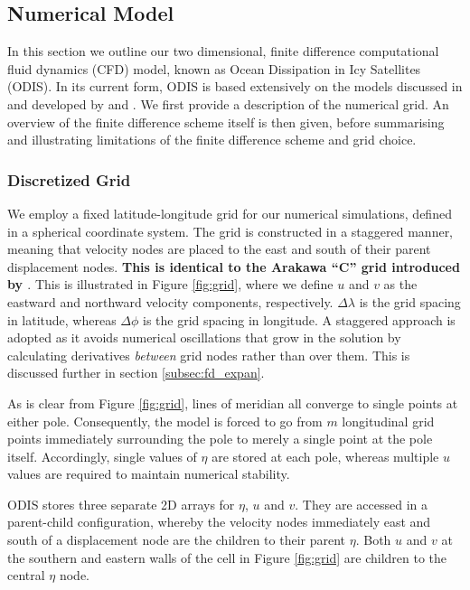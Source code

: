 \subsection{Numerical Model \label{subsec:model}}

In this section we outline our two dimensional, finite difference computational fluid dynamics (CFD) model, known as Ocean Dissipation in Icy Satellites (ODIS). In its current form, ODIS is based extensively on the models discussed in and developed by \citet{zahel1973diurnalk,zahel1978influence} and \citet{sears1994tidal,sears1995tidal}. We first provide a description of the numerical grid. An overview of the finite difference scheme itself is then given, before summarising and illustrating limitations of the finite difference scheme and grid choice.

\subsubsection{Discretized Grid \label{subsec:grid}}

We employ a fixed latitude-longitude grid for our numerical simulations, defined in a spherical coordinate system. The grid is constructed in a staggered manner, meaning that velocity nodes are placed to the east and south of their parent displacement nodes. \textbf{This is identical to the Arakawa ``C'' grid introduced by \citet{arakawa1977computational}}. This is illustrated in Figure \ref{fig:grid}, where we define $u$ and $v$ as the eastward and northward velocity components, respectively. $\Delta \lambda$ is the grid spacing in latitude, whereas $\Delta \phi$ is the grid spacing in longitude. A staggered approach is adopted as it avoids numerical oscillations that grow in the solution by calculating derivatives \textit{between} grid nodes rather than over them. This is discussed further in section \ref{subsec:fd_expan}.

As is clear from Figure \ref{fig:grid}, lines of meridian all converge to single points at either pole. Consequently, the model is forced to go from $m$ longitudinal grid points immediately surrounding the pole to merely a single point at the pole itself. Accordingly, single values of $\eta$ are stored at each pole, whereas multiple $u$ values are required to maintain numerical stability. 

ODIS stores three separate 2D arrays for $\eta$, $u$ and $v$. They are accessed in a parent-child configuration, whereby the velocity nodes immediately east and south of a displacement node are the children to their parent $\eta$. Both $u$ and $v$ at the southern and eastern walls of the cell in Figure \ref{fig:grid} are children to the central $\eta$ node. %

